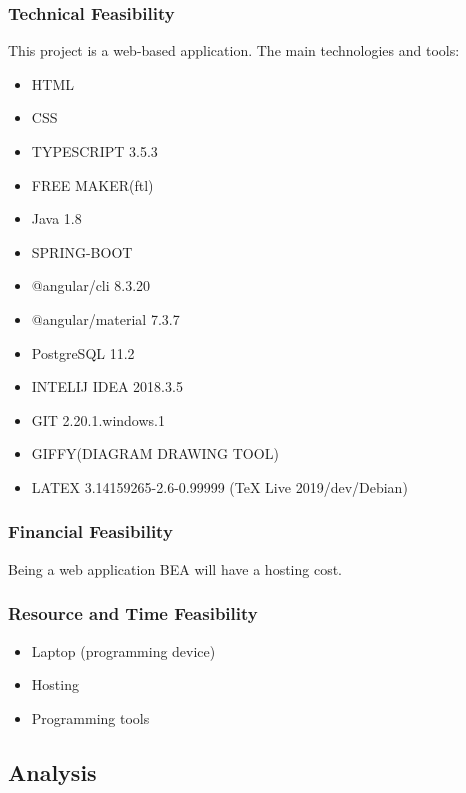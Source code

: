 \documentclass{scrartcl}
\begin{document}
\subsubsection{Technical Feasibility}
This project is a web-based application. The main technologies and tools:
\begin{itemize}
  	\item HTML
  	\item CSS
  	\item TYPESCRIPT 3.5.3
  	\item FREE MAKER(ftl)
  	\item Java 1.8
  	\item SPRING-BOOT 
  	\item @angular/cli  8.3.20
  	\item @angular/material  7.3.7
  	\item PostgreSQL  11.2
  	\item INTELIJ IDEA  2018.3.5
  	\item GIT  2.20.1.windows.1
  	\item GIFFY(DIAGRAM DRAWING TOOL)
  	\item LATEX 3.14159265-2.6-0.99999 (TeX Live 2019/dev/Debian)

  
  	
  	\end{itemize}
 \subsubsection{Financial Feasibility}
 Being a web application BEA will have a hosting cost.
 \subsubsection{Resource and Time Feasibility}
 \begin{itemize}
 \item Laptop (programming device)
 \item Hosting
 \item Programming tools
 \end{itemize}
 


\subsection{Analysis} 	 
\end{document}
